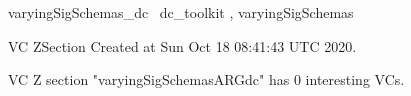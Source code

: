 \documentclass{article}
\begin{document}

\begin{zsection}	 \SECTION varyingSigSchemas\_dc \parents~dc\_toolkit , varyingSigSchemas
\end{zsection}

\newcommand{\appliesTo}{\zbinop{appliesTo}} 
\newcommand{\appliesToNofix}{\zpreop{appliesToNofix}} 

VC ZSection Created at Sun Oct 18 08:41:43 UTC 2020.



 VC Z section "varyingSigSchemasARGdc" has $0$ interesting VCs.



\end{document}
